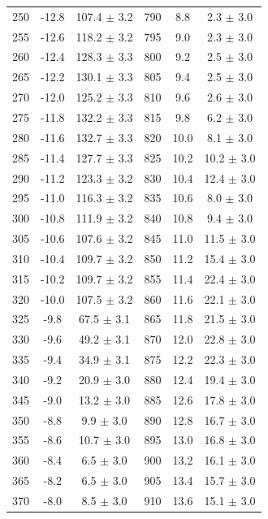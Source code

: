\documentclass[a4paper,12pt]{article}
\begin{document}
\begin{center}
\begin{longtable}{|c|c|c||c|c|c|}
250 & -12.8 & 107.4 $\pm$  3.2   & 790 & 8.8 & 2.3 $\pm$  3.0  \\
255 & -12.6 & 118.2 $\pm$  3.2   & 795 & 9.0 & 2.3 $\pm$  3.0  \\
260 & -12.4 & 128.3 $\pm$  3.3   & 800 & 9.2 & 2.5 $\pm$  3.0  \\
265 & -12.2 & 130.1 $\pm$  3.3   & 805 & 9.4 & 2.5 $\pm$  3.0  \\
270 & -12.0 & 125.2 $\pm$  3.3   & 810 & 9.6 & 2.6 $\pm$  3.0  \\
275 & -11.8 & 132.2 $\pm$  3.3   & 815 & 9.8 & 6.2 $\pm$  3.0  \\
280 & -11.6 & 132.7 $\pm$  3.3   & 820 & 10.0 & 8.1 $\pm$  3.0  \\
285 & -11.4 & 127.7 $\pm$  3.3   & 825 & 10.2 & 10.2 $\pm$  3.0  \\
290 & -11.2 & 123.3 $\pm$  3.2   & 830 & 10.4 & 12.4 $\pm$  3.0  \\
295 & -11.0 & 116.3 $\pm$  3.2   & 835 & 10.6 & 8.0 $\pm$  3.0  \\
300 & -10.8 & 111.9 $\pm$  3.2   & 840 & 10.8 & 9.4 $\pm$  3.0  \\
305 & -10.6 & 107.6 $\pm$  3.2   & 845 & 11.0 & 11.5 $\pm$  3.0  \\
310 & -10.4 & 109.7 $\pm$  3.2   & 850 & 11.2 & 15.4 $\pm$  3.0  \\
315 & -10.2 & 109.7 $\pm$  3.2   & 855 & 11.4 & 22.4 $\pm$  3.0  \\
320 & -10.0 & 107.5 $\pm$  3.2   & 860 & 11.6 & 22.1 $\pm$  3.0  \\
325 & -9.8 & 67.5 $\pm$  3.1   & 865 & 11.8 & 21.5 $\pm$  3.0  \\
330 & -9.6 & 49.2 $\pm$  3.1   & 870 & 12.0 & 22.8 $\pm$  3.0  \\
335 & -9.4 & 34.9 $\pm$  3.1   & 875 & 12.2 & 22.3 $\pm$  3.0  \\
340 & -9.2 & 20.9 $\pm$  3.0   & 880 & 12.4 & 19.4 $\pm$  3.0  \\
345 & -9.0 & 13.2 $\pm$  3.0   & 885 & 12.6 & 17.8 $\pm$  3.0  \\
350 & -8.8 & 9.9 $\pm$  3.0   & 890 & 12.8 & 16.7 $\pm$  3.0  \\
355 & -8.6 & 10.7 $\pm$  3.0   & 895 & 13.0 & 16.8 $\pm$  3.0  \\
360 & -8.4 & 6.5 $\pm$  3.0   & 900 & 13.2 & 16.1 $\pm$  3.0  \\
365 & -8.2 & 6.5 $\pm$  3.0   & 905 & 13.4 & 15.7 $\pm$  3.0  \\
370 & -8.0 & 8.5 $\pm$  3.0   & 910 & 13.6 & 15.1 $\pm$  3.0  \\

\end{longtable}
\end{center}
\end{document}
